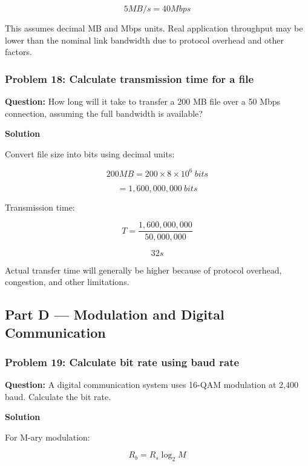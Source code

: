 \[
\boxed{5MB/s=40Mbps}
\]



This assumes decimal MB and Mbps units. Real application throughput may be lower than the nominal link bandwidth due to protocol overhead and other factors.

\subsubsection*{Problem 18: Calculate transmission time for a file}

\textbf{Question:} How long will it take to transfer a 200 MB file over a 50 Mbps connection, assuming the full bandwidth is available?

\textbf{Solution}

Convert file size into bits using decimal units:



\[
200MB=200\times8\times10^6\ bits
\]





\[
=1,600,000,000\ bits
\]



Transmission time:



\[
T=\frac{1,600,000,000}{50,000,000}
\]





\[
\boxed{32s}
\]



Actual transfer time will generally be higher because of protocol overhead, congestion, and other limitations.

\subsection{Part D --- Modulation and Digital Communication}
\subsubsection*{Problem 19: Calculate bit rate using baud rate}

\textbf{Question:} A digital communication system uses 16-QAM modulation at 2,400 baud. Calculate the bit rate.

\textbf{Solution}

For M-ary modulation:



\[
R_b=R_s\log_2M
\]



